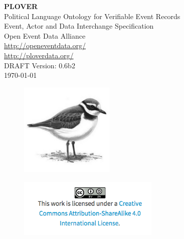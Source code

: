 \documentclass[11pt]{report}
\begin{document}

\vspace{-10pt}  

      \begin{center}
            {\Huge \bfseries PLOVER\ }\\[2ex] 
            {\LARGE Political Language Ontology for Verifiable Event Records\\ [2ex]Event, Actor and Data Interchange Specification}\\[10ex] 
            {\LARGE Open Event Data Alliance} \\[2ex] 
            {\Large \url{http://openeventdata.org/} }\\[2ex] 
            {\Large \url{http://ploverdata.org/} }\\[6ex]            
            {\LARGE DRAFT Version: 0.6b2\\ [2EX]\monthyeardate\today}
        \end{center}


\begin{figure}[h!]
\centering
\includegraphics[width=0.40\textwidth]{media/plover_icon}
\end{figure}

\vspace{20pt}   


\begin{figure}[h!]
\centering
\includegraphics[width=0.6\textwidth]{media/cc_license}
\end{figure}
\end{document}
